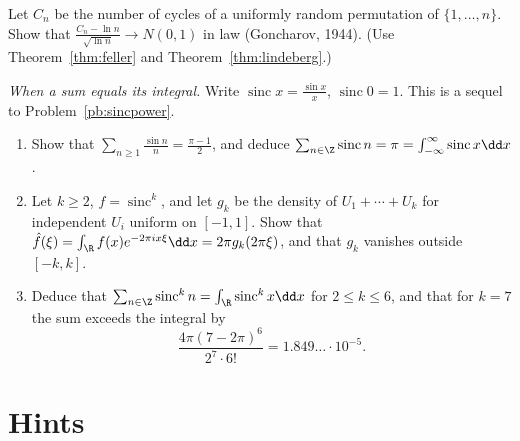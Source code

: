 \begin{exercise}[$\star\star\star$]\label{ex:cyclesclt}
Let $C_n$ be the number of cycles of a uniformly random permutation of $\{1,\dots,n\}$. Show that $\frac{C_n-\ln n}{\sqrt{\ln n}}\to N(0,1)$ in law
(Goncharov, 1944). (Use Theorem~\ref{thm:feller} and Theorem~\ref{thm:lindeberg}.)
\end{exercise}

\begin{exercise}[$\star\star\star$]\label{pb:sincsum}
\emph{When a sum equals its integral.} Write $\operatorname{sinc}x=\frac{\sin x}x$, $\operatorname{sinc}0=1$. This is a sequel to
Problem~\ref{pb:sincpower}.
\begin{enumerate}[label=(\alph*)]
\item Show that $\sum_{n\ge1}\frac{\sin n}n=\frac{\pi-1}2$, and deduce $\sum_{n\in\Z}\operatorname{sinc}n=\pi=\int_{-\infty}^\infty\operatorname{sinc}x\dd x$.
\item Let $k\ge2$, $f=\operatorname{sinc}^k$, and let $g_k$ be the density of $U_1+\cdots+U_k$ for independent $U_i$ uniform on $[-1,1]$. Show
that $\hat f(\xi)=\int_{\R}f(x)e^{-2\pi ix\xi}\dd x=2\pi g_k(2\pi\xi)$, and that $g_k$ vanishes outside $[-k,k]$.
\item Deduce that $\sum_{n\in\Z}\operatorname{sinc}^kn=\int_{\R}\operatorname{sinc}^kx\dd x$ for $2\le k\le6$, and that for $k=7$ the sum exceeds the
integral by
\[
\frac{4\pi(7-2\pi)^6}{2^7\cdot6!}=1.849\ldots\cdot10^{-5}.
\]
\end{enumerate}
\end{exercise}

\section{Hints}

